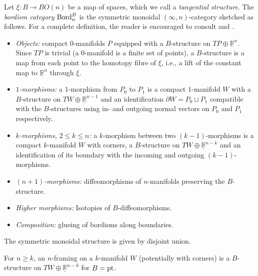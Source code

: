 \documentclass{amsart}
\begin{document}
\begin{definition}
Let $\xi\colon B \to BO(n)$ be a map of spaces, which we call a \emph{tangential structure}. The \emph{bordism category} $\operatorname{Bord}_n^B$ is the symmetric monoidal $(\infty,n)$-category sketched as follows. For a complete definition, the reader is encouraged to consult \cite{MR3924174} and \cite[Section~2.2]{MR2555928}.

\begin{itemize}
    \item[$\natural_1$] \emph{Objects:} compact $0$-manifolds $P$ equipped with a $B$-structure on $TP \oplus \underline{\mathbb{R}}^n$. Since $TP$ is trivial (a $0$-manifold is a finite set of points), a $B$-structure is a map from each point to the homotopy fibre of $\xi$, i.e., a lift of the constant map to $\underline{\mathbb{R}}^n$ through $\xi$.
    
    \item[$\natural_2$] \emph{$1$-morphisms:} a $1$-morphism from $P_0$ to $P_1$ is a compact $1$-manifold $W$ with a $B$-structure on $TW \oplus \underline{\mathbb{R}}^{n-1}$ and an identification $\partial W = P_0 \sqcup P_1$ compatible with the $B$-structures using in- and outgoing normal vectors on $P_0$ and $P_1$ respectively.
    
    \item[$\natural_3$] \emph{$k$-morphisms, $2 \le k \le n$:} a $k$-morphism between two $(k-1)$-morphisms is a compact $k$-manifold $W$ with corners, a $B$-structure on $TW \oplus \underline{\mathbb{R}}^{n-k}$ and an identification of its boundary with the incoming and outgoing $(k-1)$-morphisms.
    
    \item[$\natural_4$] \emph{$(n+1)$-morphisms:} diffeomorphisms of $n$-manifolds preserving the $B$-structure.
    \item[$\natural_5$] \emph{Higher morphisms:} Isotopies of $B$-diffeomorphisms.
    
    \item[$\natural_6$] \emph{Composition:} glueing of bordisms along boundaries.
\end{itemize}
The symmetric monoidal structure is given by disjoint union.
\end{definition}

\begin{definition}
For $n \geq k$, an $n$-framing on a $k$-manifold $W$ (potentially with corners) is a $B$-structure on $TW \oplus \underline{\mathbb{R}}^{n-k}$ for $B = \operatorname{pt}$.
\end{definition}
\end{document}
